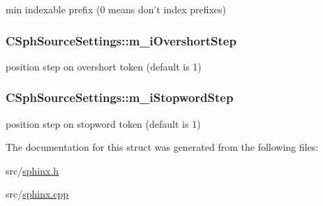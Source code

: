 min indexable prefix (0 means don't index prefixes) 

\hypertarget{structCSphSourceSettings_a6a95197835b39a65f765c9aa78c3a4e9}{
\subsubsection[{m\-\_\-i\-Overshort\-Step}]{ C\-Sph\-Source\-Settings\-::m\-\_\-i\-Overshort\-Step}}\label{structCSphSourceSettings_a6a95197835b39a65f765c9aa78c3a4e9}


position step on overshort token (default is 1) 

\hypertarget{structCSphSourceSettings_a5b1d0d84201dde3c42108451572b9814}{
\subsubsection[{m\-\_\-i\-Stopword\-Step}]{ C\-Sph\-Source\-Settings\-::m\-\_\-i\-Stopword\-Step}}\label{structCSphSourceSettings_a5b1d0d84201dde3c42108451572b9814}


position step on stopword token (default is 1) 



The documentation for this struct was generated from the following files\-:\begin{DoxyCompactItemize}
\item 
src/\hyperlink{sphinx_8h}{sphinx.\-h}\item 
src/\hyperlink{sphinx_8cpp}{sphinx.\-cpp}\end{DoxyCompactItemize}
